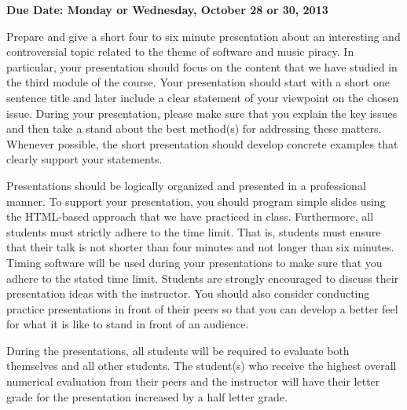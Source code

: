 

\usepackage[compact]{titlesec}



\vspace*{-.2in}
\begin{center}
	{\bf Due Date: Monday or Wednesday, October 28 or 30, 2013}
\end{center}

Prepare and give a short four to six minute presentation about an interesting and controversial topic related to the
theme of software and music piracy. In particular, your presentation should focus on the content that we have studied in
the third module of the course. Your presentation should start with a short one sentence title and later include a clear
statement of your viewpoint on the chosen issue. During your presentation, please make sure that you explain the key
issues and then take a stand about the best method(s) for addressing these matters. Whenever possible, the short
presentation should develop concrete examples that clearly support your statements.

Presentations should be logically organized and presented in a professional manner. To support your presentation, you
should program simple slides using the HTML-based approach that we have practiced in class. Furthermore, all
students must strictly adhere to the time limit. That is, students must ensure that their talk is not shorter than four
minutes and not longer than six minutes. Timing software will be used during your presentations to make sure that you
adhere to the stated time limit. Students are strongly encouraged to discuss their presentation ideas with the
instructor.  You should also consider conducting practice presentations in front of their peers so that you can develop
a better feel for what it is like to stand in front of an audience.

During the presentations, all students will be required to evaluate both themselves and all other students.  The student(s)
who receive the highest overall numerical evaluation from their peers and the instructor will have their letter grade
for the presentation increased by a half letter grade.


